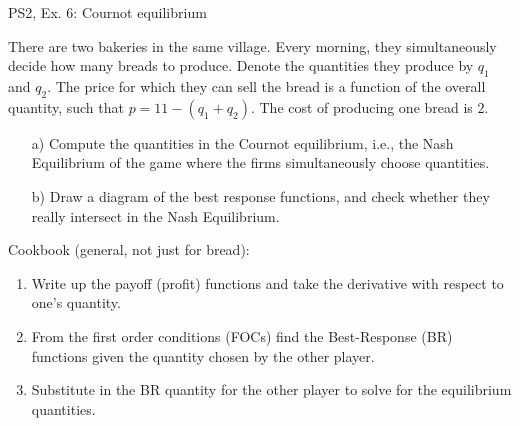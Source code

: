 \begin{frame}{PS2, Ex. 6: Cournot equilibrium}
  \begin{multicols}{2}
    There are two bakeries in the same village. Every morning, they simultaneously decide how many breads to produce. Denote the quantities they produce by $q_1$ and $q_2$. The price for which they can sell the bread is a function of the overall quantity, such that $p=11-(q_1+q_2)$. The cost of producing one bread is $2$.
    \begin{itemize}
      \item[a)] Compute the quantities in the Cournot equilibrium, i.e., the Nash Equilibrium of the game where the firms simultaneously choose quantities.
      \item[b)]  Draw a diagram of the best response functions, and check whether they really intersect in the Nash Equilibrium.
    \end{itemize}
  \vfill\null \columnbreak
    Cookbook (general, not just for bread):
    \begin{enumerate}
      \item Write up the payoff (profit) functions and take the derivative with respect to one's quantity.
      \item From the first order conditions (FOCs) find the Best-Response (BR) functions given the quantity chosen by the other player.
      \item Substitute in the BR quantity for the other player to solve for the equilibrium quantities.
    \end{enumerate}
  \vfill\null
  \end{multicols}
\end{frame}
